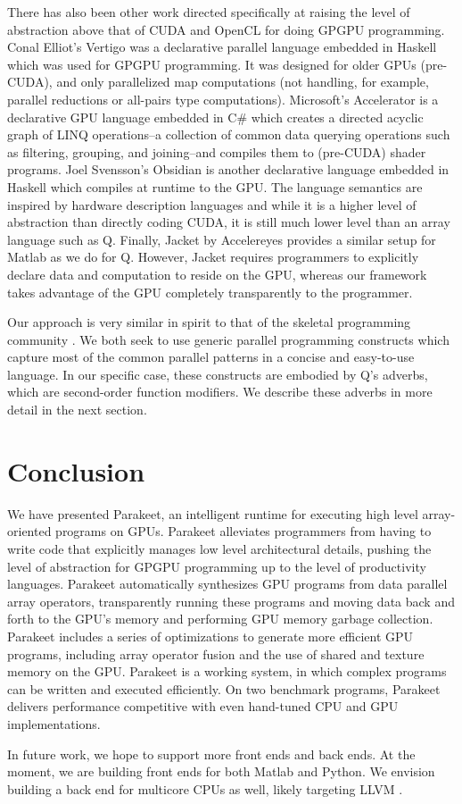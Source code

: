 \documentclass[preprint]{sigplanconf}
\begin{document}
There has also been other work directed specifically at raising the level of
abstraction above that of CUDA and OpenCL for doing GPGPU programming.  Conal
Elliot's Vertigo \cite{Elli04} was a declarative parallel language embedded in
Haskell which was used for GPGPU programming.  It was designed for older GPUs
(pre-CUDA), and only parallelized map computations (not handling, for example,
parallel reductions or all-pairs type computations).  Microsoft's Accelerator
\cite{Tard06} is a declarative GPU language embedded in C\# which creates a
directed acyclic graph of LINQ operations--a collection of common data querying
operations such as filtering, grouping, and joining--and compiles them to
(pre-CUDA) shader programs.  Joel Svensson's Obsidian \cite{Sven08} is another
declarative language embedded in Haskell which compiles at runtime to the GPU.
The language semantics are inspired by hardware description languages and while
it is a higher level of abstraction than directly coding CUDA, it is still much
lower level than an array language such as Q.  Finally, Jacket by Accelereyes
\cite{AcceJa} provides a similar setup for Matlab as we do for Q.  However,
Jacket requires programmers to explicitly declare data and computation to reside
on the GPU, whereas our framework takes advantage of the GPU completely
transparently to the programmer.

Our approach is very similar in spirit to that of the skeletal programming
community \cite{Cole04}.  We both seek to use generic parallel programming
constructs which capture most of the common parallel patterns in a concise and
easy-to-use language.  In our specific case, these constructs are embodied by
Q's adverbs, which are second-order function modifiers.  We describe these
adverbs in more detail in the next section.

\section{Conclusion}
\label{Conclusion}

We have presented Parakeet, an intelligent runtime for executing high level
array-oriented programs on GPUs.  Parakeet alleviates programmers from having
to write code that explicitly manages low level architectural details, pushing
the level of abstraction for GPGPU programming up to the level of productivity
languages.  Parakeet automatically synthesizes GPU programs from data parallel
array operators, transparently running these programs and moving data back and
forth to the GPU's memory and performing GPU memory garbage collection.
Parakeet includes a series of optimizations to generate more efficient GPU
programs, including array operator fusion and the use of shared and texture
memory on the GPU.  Parakeet is a working system, in which complex programs can
be written and executed efficiently.  On two benchmark programs, Parakeet
delivers performance competitive with even hand-tuned CPU and GPU
implementations.

In future work, we hope to support more front ends and back ends.  At the
moment, we are building front ends for both Matlab and Python.  We envision
building a back end for multicore CPUs as well, likely targeting LLVM
\cite{Latt02}.


{}
\end{document}
